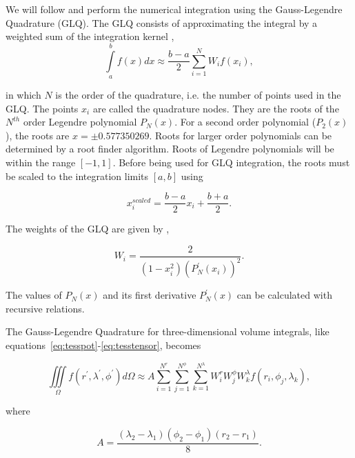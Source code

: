 \documentclass[paper,twocolumn,twoside]{geophysics}
\begin{document}
We will follow \citet{Asgharzadeh2007} and perform the numerical integration
using the Gauss-Legendre Quadrature (GLQ).
The GLQ consists of approximating the integral by a weighted sum of the
integration kernel \citep{Hildebrand1987},
\begin{equation}
    \int\limits_a^b f(x) dx \approx
    \frac{b-a}{2}\sum\limits_{i=1}^N W_i f(x_i),
    \label{eq:glq1d}
\end{equation}

\noindent
in which $N$ is the order of the quadrature,
i.e. the number of points used in the GLQ.
The points $x_i$ are called the quadrature nodes.
They are the roots of the $N^{th}$ order Legendre polynomial $P_N(x)$.
For a second order polynomial ($P_2(x)$),
the roots are $x = \pm 0.577350269$.
Roots for larger order polynomials
can be determined by a root finder algorithm.
Roots of Legendre polynomials
will be within the range $[-1, 1]$.
Before being used for GLQ integration,
the roots must be scaled to the integration limits $[a, b]$ using

\begin{equation}
    x^{scaled}_i = \frac{b - a}{2} x_i + \frac{b + a}{2}.
    \label{eq:glq_scaling}
\end{equation}

The weights of the GLQ are given by \citep{Hildebrand1987},

\begin{equation}
    W_i = \frac{2}{(1 - x_i^2)(P^\prime_N(x_i))^2}.
    \label{eq:glq_weights}
\end{equation}

\noindent
The values of $P_N(x)$ and its first derivative $P^\prime_N(x)$
can be calculated with recursive relations.

The Gauss-Legendre Quadrature for three-dimensional volume integrals,
like equations~\ref{eq:tesspot}-\ref{eq:tesstensor},
becomes \citep{Asgharzadeh2007}

\begin{equation}
    \iiint\limits_{\Omega}
    f(r^\prime, \lambda^\prime, \phi^\prime)
    d\Omega
    \approx
    A
    \sum\limits_{i=1}^{N^r}
    \sum\limits_{j=1}^{N^\phi}
    \sum\limits_{k=1}^{N^\lambda}
    W_i^r W_j^\phi W_k^\lambda
    f(r_i, \phi_j, \lambda_k),
    \label{eq:glq3d}
\end{equation}

\noindent
where

\begin{equation}
    A = \frac{(\lambda_2 - \lambda_1)(\phi_2 - \phi_1)(r_2 - r_1)}{8}.
\end{equation}
\end{document}
